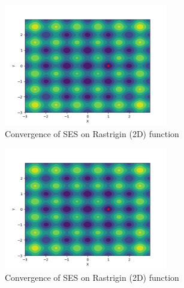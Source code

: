 \begin{figure}
  \begin{center}
  \includegraphics[width=2.8in]{./../code/test_evolution_strategy_results/test_evolution_strategy-rastrigin-SES.png}
  \caption{Convergence of SES on Rastrigin (2D) function}
  \label{img:test_evolution_strategy-rastrigin-SES}
  \end{center}
\end{figure}





\begin{figure}
  \begin{center}
  \includegraphics[width=2.8in]{./../code/test_evolution_strategy_results/test_evolution_strategy-rastrigin-SES.png}
  \caption{Convergence of SES on Rastrigin (2D) function}
  \label{img:test_evolution_strategy-rastrigin-SES}
  \end{center}
\end{figure}

